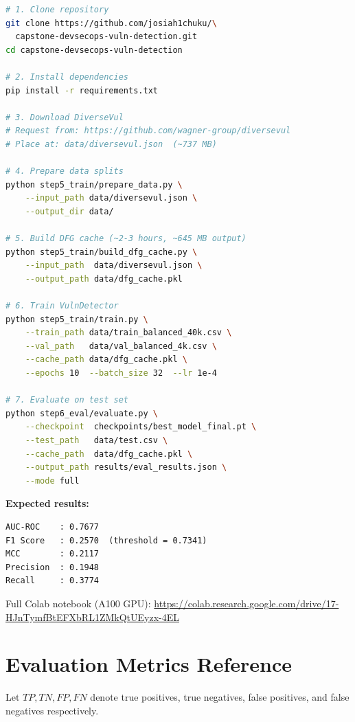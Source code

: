 \documentclass[12pt, letterpaper]{article}
\begin{document}
\begin{appendices}
\begin{lstlisting}[language=bash, numbers=none,
                   caption={End-to-end reproduction commands}]
# 1. Clone repository
git clone https://github.com/josiah1chuku/\
  capstone-devsecops-vuln-detection.git
cd capstone-devsecops-vuln-detection

# 2. Install dependencies
pip install -r requirements.txt

# 3. Download DiverseVul
# Request from: https://github.com/wagner-group/diversevul
# Place at: data/diversevul.json  (~737 MB)

# 4. Prepare data splits
python step5_train/prepare_data.py \
    --input_path data/diversevul.json \
    --output_dir data/

# 5. Build DFG cache (~2-3 hours, ~645 MB output)
python step5_train/build_dfg_cache.py \
    --input_path  data/diversevul.json \
    --output_path data/dfg_cache.pkl

# 6. Train VulnDetector
python step5_train/train.py \
    --train_path data/train_balanced_40k.csv \
    --val_path   data/val_balanced_4k.csv \
    --cache_path data/dfg_cache.pkl \
    --epochs 10  --batch_size 32  --lr 1e-4

# 7. Evaluate on test set
python step6_eval/evaluate.py \
    --checkpoint  checkpoints/best_model_final.pt \
    --test_path   data/test.csv \
    --cache_path  data/dfg_cache.pkl \
    --output_path results/eval_results.json \
    --mode full
\end{lstlisting}

\noindent\textbf{Expected results:}
\begin{lstlisting}[language={}, numbers=none]
AUC-ROC    : 0.7677
F1 Score   : 0.2570  (threshold = 0.7341)
MCC        : 0.2117
Precision  : 0.1948
Recall     : 0.3774
\end{lstlisting}

\noindent Full Colab notebook (A100 GPU):
\url{https://colab.research.google.com/drive/17-HJnTymfBtEFXbRL1ZMkQtUEyzx-4EL}

\section{Evaluation Metrics Reference}
\label{app:metrics}

Let $TP,TN,FP,FN$ denote true positives, true negatives, false positives,
and false negatives respectively.


\end{appendices}
\end{document}

